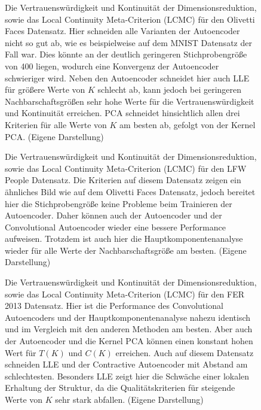 \begin{figure}[ht]
	\begin{center}
		
	\end{center}
	\caption[Olivetti Faces Qualitätskriterien]{Die Vertrauenswürdigkeit und Kontinuität der Dimensionsreduktion, sowie das Local Continuity Meta-Criterion (LCMC) für den Olivetti Faces Datensatz. Hier schneiden alle Varianten der Autoencoder nicht so gut ab, wie es beispielweise auf dem MNIST Datensatz der Fall war. Dies könnte an der deutlich geringeren Stichprobengröße von 400 liegen, wodurch eine Konvergenz der Autoencoder schwieriger wird. Neben den Autoencoder schneidet hier auch LLE für größere Werte von $K$ schlecht ab, kann jedoch bei geringeren Nachbarschaftsgrößen sehr hohe Werte für die Vertrauenswürdigkeit und Kontinuität erreichen. PCA schneidet hinsichtlich allen drei Kriterien für alle Werte von $K$ am besten ab, gefolgt von der Kernel PCA. (Eigene Darstellung)}
	\label{fig:OlivettiFacesMetrics}
\end{figure}

\begin{figure}[ht]
	\begin{center}
		
	\end{center}
	\caption[LFW People Qualitätskriterien]{Die Vertrauenswürdigkeit und Kontinuität der Dimensionsreduktion, sowie das Local Continuity Meta-Criterion (LCMC) für den LFW People Datensatz. Die Kriterien auf diesem Datensatz zeigen ein ähnliches Bild wie auf dem Olivetti Faces Datensatz, jedoch bereitet hier die Stichprobengröße keine Probleme beim Trainieren der Autoencoder. Daher können auch der Autoencoder und der Convolutional Autoencoder wieder eine bessere Performance aufweisen. Trotzdem ist auch hier die Hauptkomponentenanalyse wieder für alle Werte der Nachbarschaftsgröße am besten. (Eigene Darstellung)}
	\label{fig:LfwPeopleMetrics}
\end{figure}

\begin{figure}[ht]
	\begin{center}
		
	\end{center}
	\caption[FER2013 Qualitätskriterien]{Die Vertrauenswürdigkeit und Kontinuität der Dimensionsreduktion, sowie das Local Continuity Meta-Criterion (LCMC) für den FER 2013 Datensatz. Hier ist die Performance des Convolutional Autoencoders und der Hauptkomponentenanalyse nahezu identisch und im Vergleich mit den anderen Methoden am besten. Aber auch der Autoencoder und die Kernel PCA können einen konstant hohen Wert für $T(K)$ und $C(K)$ erreichen. Auch auf diesem Datensatz schneiden LLE und der Contractive Autoencoder mit Abstand am schlechtesten. Besonders LLE zeigt hier die Schwäche einer lokalen Erhaltung der Struktur, da die Qualitätskriterien für steigende Werte von $K$ sehr stark abfallen. (Eigene Darstellung)}
	\label{fig:FER2013Metrics}
\end{figure}